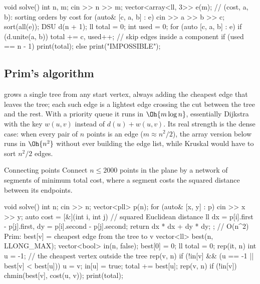 \begin{code}
void solve() {
    int n, m;
    cin >> n >> m;
    vector<array<ll, 3>> e(m);  // (cost, a, b): sorting orders by cost
    for (auto& [c, a, b] : e) cin >> a >> b >> c;
    sort(all(e));
    DSU d(n + 1);
    ll total = 0;
    int used = 0;
    for (auto [c, a, b] : e)
        if (d.unite(a, b)) total += c, used++;  // skip edges inside a component
    if (used == n - 1) print(total);
    else print("IMPOSSIBLE");
}
\end{code}


\subsection{Prim's algorithm}

 grows a single tree from any start vertex, always adding the cheapest edge that leaves the tree; each
such edge is a lightest edge crossing the cut between the tree and the rest. With a priority queue it runs in $\Oh{m \log n}$,
essentially Dijkstra with the key $w(u, v)$ instead of $d(u) + w(u, v)$. Its real strength is the dense case: when every pair of
$n$ points is an edge ($m \approx n^2/2$), the array version below runs in $\Oh{n^2}$ without ever building the edge list, while
Kruskal would have to sort $n^2/2$ edges.

\begin{problem}{Connecting points}
Connect $n \le 2000$ points in the plane by a network of segments of minimum total cost, where a segment costs the squared
distance between its endpoints.
\end{problem}

\begin{code}
void solve() {
    int n;
    cin >> n;
    vector<pll> p(n);
    for (auto& [x, y] : p) cin >> x >> y;
    auto cost = [&](int i, int j) {  // squared Euclidean distance
        ll dx = p[i].first - p[j].first, dy = p[i].second - p[j].second;
        return dx * dx + dy * dy;
    };
    // O(n^2) Prim: best[v] = cheapest edge from the tree to v
    vector<ll> best(n, LLONG_MAX);
    vector<bool> in(n, false);
    best[0] = 0;
    ll total = 0;
    rep(it, n) {
        int u = -1;  // the cheapest vertex outside the tree
        rep(v, n) if (!in[v] && (u == -1 || best[v] < best[u])) u = v;
        in[u] = true;
        total += best[u];
        rep(v, n) if (!in[v]) chmin(best[v], cost(u, v));
    }
    print(total);
}
\end{code}

